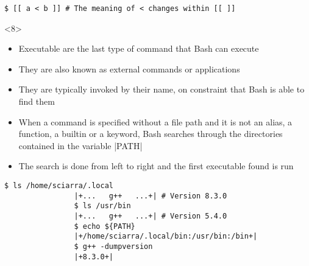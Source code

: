 \begin{frame}
\begin{overlayarea}{\textwidth}{0.7\textheight}
\begin{onlyenv}
\begin{lstlisting}[style=MyBash]
                $ [[ a < b ]] # The meaning of < changes within [[ ]]
            \end{lstlisting}
        \end{onlyenv}
        \begin{onlyenv}<8>
            \begin{itemize}
                \item Executable are the last type of command that Bash can execute
                \item They are also known as external commands or applications
                \item They are typically invoked by their name, on constraint that Bash is able to find them
                \item When a command is specified without a file path and it is \alert{not an alias, a function, a builtin or a keyword}, Bash searches through the directories contained in the variable \bash|PATH|
                \item The search is done from left to right and the first executable found is run
            \end{itemize}
            \begin{lstlisting}[style=MyBash]
                $ ls /home/sciarra/.local
                |+...   g++   ...+| # Version 8.3.0
                $ ls /usr/bin
                |+...   g++   ...+| # Version 5.4.0
                $ echo ${PATH}
                |+/home/sciarra/.local/bin:/usr/bin:/bin+|
                $ g++ -dumpversion
                |+8.3.0+|
            \end{lstlisting}
        \end{onlyenv}
    \end{overlayarea}
\end{frame}
